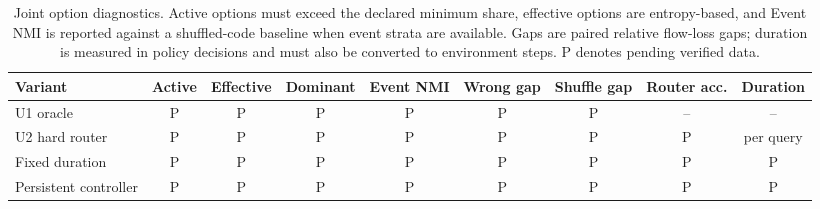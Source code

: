 \begin{table}[t]
\centering
\scriptsize
\setlength{\tabcolsep}{3.5pt}
\begin{tabular}{lcccccccc}
\toprule
Variant & Active & Effective & Dominant & Event NMI & Wrong gap & Shuffle gap & Router acc. & Duration \\
\midrule
U1 oracle & P & P & P & P & P & P & -- & -- \\
U2 hard router & P & P & P & P & P & P & P & per query \\
Fixed duration & P & P & P & P & P & P & P & P \\
Persistent controller & P & P & P & P & P & P & P & P \\
\bottomrule
\end{tabular}
\caption{Joint option diagnostics.  Active options must exceed the declared
minimum share, effective options are entropy-based, and Event NMI is reported
against a shuffled-code baseline when event strata are available.  Gaps are
paired relative flow-loss gaps; duration is measured in policy decisions and
must also be converted to environment steps.  P denotes pending verified data.}
\label{tab:option-statistics}
\end{table}

